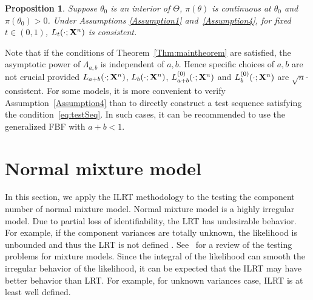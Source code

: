 \documentclass[11pt]{article}
\theoremstyle{plain}
\newtheorem{proposition}{\quad\quad Proposition}
\theoremstyle{definition}
\theoremstyle{remark}
\begin{document}
\begin{proposition}\label{Theoremless1}
    Suppose $\theta_0$ is an interior of $\Theta$, $\pi(\theta)$ is continuous at $\theta_0$ and $\pi(\theta_0)>0$.
    Under Assumptions \ref{Assumption1} and~\ref{Assumption4}, for fixed $t\in(0,1)$, $L_t(\cdot;\mathbf{X}^{n})$ is consistent.
\end{proposition}
Note that if the conditions of Theorem~\ref{Thm:maintheorem} are satisfied, the asymptotic power of $\Lambda_{a,b}$ is independent of $a,b$.
Hence specific choices of $a,b$ are not crucial provided $L_{a+b}(\cdot;\mathbf{X}^{n})$, $L_b(\cdot;\mathbf{X}^{n})$, $L^{(0)}_{a+b}(\cdot;\mathbf{X}^{n})$ and $L^{(0)}_b(\cdot;\mathbf{X}^{n})$ are $\sqrt{n}$-consistent.
For some models, it is more convenient to verify Assumption~\ref{Assumption4} than to directly construct a test sequence satisfying the condition~\eqref{eq:testSeq}.
In such cases, it can be recommended to use the generalized FBF with $a+b< 1$.



\section{Normal mixture model}
In this section, we apply the ILRT methodology to the testing the component number of normal mixture model.
Normal mixture model is a highly irregular model.
Due to partial loss of identifiability, the LRT has undesirable behavior.
For example, if the component variances are totally unknown, the likelihood is unbounded and thus the LRT is not defined \citep{Cam1990Maximum}.
See~\cite{chenjiahua2017} for a review of the testing problems for mixture models.
Since the integral of the likelihood can smooth the irregular behavior of the likelihood, it can be expected that the ILRT may have better behavior than LRT.
For example, for unknown variances case, ILRT is at least well defined.
\end{document}
